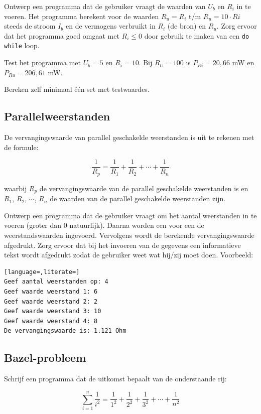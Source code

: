\documentclass[a4paper,10pt,fleqn,twoside]{article}
\begin{document}
Ontwerp een programma dat de gebruiker vraagt de waarden van $U_b$ en $R_i$ in te voeren. Het programma berekent voor de waarden $R_u = R_i$ t/m $R_u = 10\cdot Ri$ steeds de stroom $I_b$ en de vermogens verbruikt in $R_i$ (de bron) en $R_u$. Zorg ervoor dat het programma goed omgaat met $R_i \leq 0$ door gebruik te maken van een \lstinline|do while| loop.

Test het programma met $U_b=5$ en $R_i=10$. Bij $R_U=100$ is $P_{Ri}=20,66$ mW en $P_{Ru}=206,61$ mW.

Bereken zelf minimaal één set met testwaardes.

\subsection{Parallelweerstanden}
De vervangingswaarde van parallel geschakelde weerstanden is uit te rekenen met de formule:

\begin{equation*}
\dfrac{1}{R_p} =\dfrac{1}{R_1} + \dfrac{1}{R_2} + \cdots + \dfrac{1}{R_n} 
\end{equation*}

waarbij $R_p$ de vervangingswaarde van de parallel geschakelde weerstanden is en $R_1$, $R_2$, $\cdots$, $R_n$ de waarden van de parallel geschakelde weerstanden zijn.

Ontwerp een programma dat de gebruiker vraagt om het aantal weerstanden in te voeren (groter dan 0 natuurlijk). Daarna worden een voor een de weerstandswaarden ingevoerd. Vervolgens wordt de berekende vervangingswaarde afgedrukt. Zorg ervoor dat bij het invoeren van de gegevens een informatieve tekst wordt afgedrukt zodat de gebruiker weet wat hij/zij moet doen. Voorbeeld:

\begin{lstlisting}[language=,literate=]
Geef aantal weerstanden op: 4
Geef waarde weerstand 1: 6
Geef waarde weerstand 2: 2
Geef waarde weerstand 3: 10
Geef waarde weerstand 4: 8
De vervangingswaarde is: 1.121 Ohm
\end{lstlisting}

\subsection{Bazel-probleem }
Schrijf een programma dat de uitkomst bepaalt van de onderstaande rij:

\begin{equation*}
\sum_{i=1}^n \dfrac{1}{i^2} = \dfrac{1}{1^2} + \dfrac{1}{2^2} + \dfrac{1}{3^2} + \cdots + \dfrac{1}{n^2}
\end{equation*}
\end{document}
